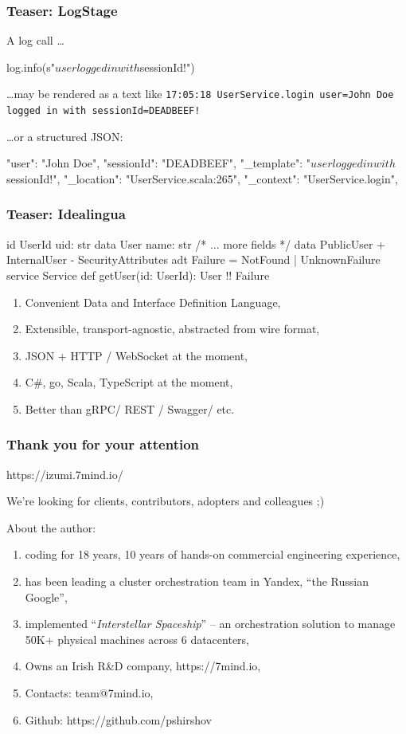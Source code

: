 \documentclass[usenames,dvipsnames]{beamer}
\begin{document}
\begin{frame}[fragile]
\frametitle{Teaser: LogStage}
A log call \dots
\begin{scalacode}
log.info(s"$user logged in with $sessionId!")
\end{scalacode}

\dots may be rendered as a text like \texttt{17:05:18 UserService.login user=John Doe logged in with sessionId=DEADBEEF!}

\dots or a structured JSON:
\begin{jsoncode}
{
  "user": "John Doe",
  "sessionId": "DEADBEEF",
  "_template": "$user logged in with $sessionId!",
  "_location": "UserService.scala:265",
  "_context": "UserService.login",
}
\end{jsoncode}
\end{frame}

\begin{frame}[fragile]
\frametitle{Teaser: Idealingua}
\begin{textcode}
id UserId { uid: str }
data User {  name: str /* ... more fields */ }
data PublicUser {
 + InternalUser
 - SecurityAttributes 
}
adt Failure = NotFound | UnknownFailure
service Service {
  def getUser(id: UserId): User !! Failure
}
\end{textcode}

\begin{enumerate}
\item Convenient Data and Interface Definition Language,
\item Extensible, transport-agnostic, abstracted from wire format,
\item JSON + HTTP / WebSocket at the moment,
\item C\#, go, Scala, TypeScript at the moment,
\item Better than gRPC/ REST / Swagger/ etc.
\end{enumerate}
\end{frame}

\begin{frame}
    \frametitle{Thank you for your attention}

    \begin{center}
      https://izumi.7mind.io/

      We're looking for clients, contributors, adopters and colleagues ;)
    \end{center}

    About the author:
    \begin{enumerate}
        \item coding for 18 years, 10 years of hands-on commercial engineering experience,
        \item has been leading a cluster orchestration team in Yandex, ``the Russian Google'',
        \item implemented ``\textit{Interstellar Spaceship}'' -- an orchestration solution to manage 50K+ physical machines across 6 datacenters,
        \item Owns an Irish R\&D company, https://7mind.io,
        \item Contacts: team@7mind.io,
        \item Github: https://github.com/pshirshov
    \end{enumerate}
\end{frame}
\end{document}
